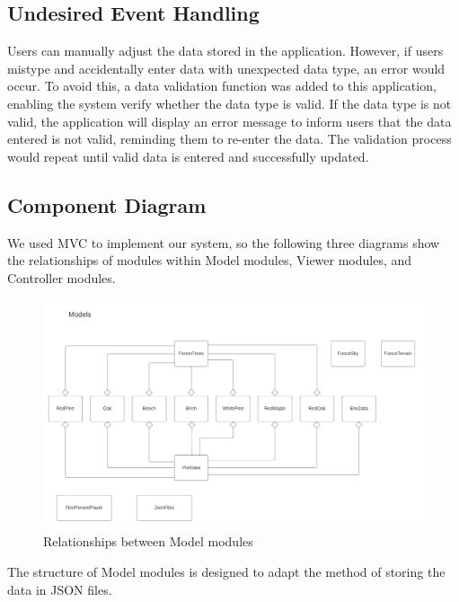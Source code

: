 \documentclass[12pt, titlepage]{article}
\begin{document}
\subsection{Undesired Event Handling}

Users can manually adjust the data stored in the application. However, if users mistype and accidentally enter data with unexpected data type, an error would occur. To avoid this, a data validation function was added to this application, enabling the system verify whether the data type is valid. If the data type is not valid, the application will display an error message to inform users that the data entered is not valid, reminding them to re-enter the data. The validation process would repeat until valid data is entered and successfully updated. 

\newpage

\subsection{Component Diagram}

We used MVC to implement our system, so the following three diagrams show the relationships of
modules within Model modules, Viewer modules, and Controller modules.

\begin{figure}[H]
\caption{Relationships between Model modules}
\includegraphics[scale=0.65]{SysDesPic/Model-Modules.png}
\end{figure}

\noindent The structure of Model modules is designed to adapt the method of storing the data in JSON files. 

\newpage
\end{document}
